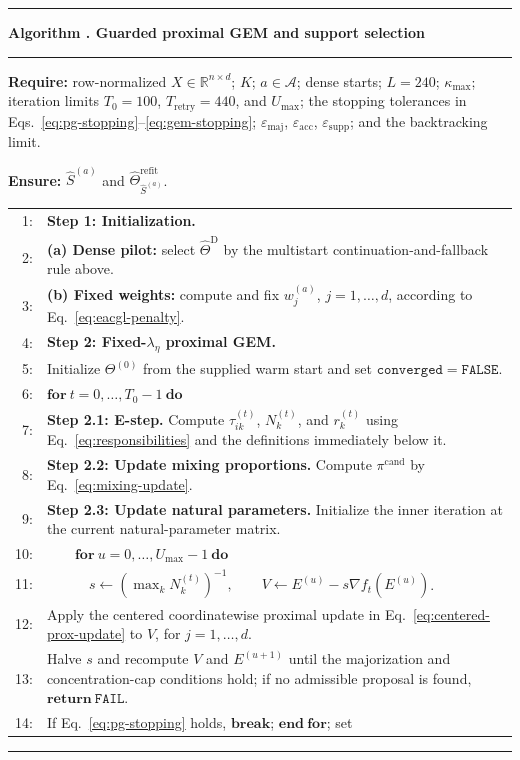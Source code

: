 \documentclass[preprint,12pt,authoryear]{elsarticle}
\newcounter{algorithm}
\newenvironment{boxedalgorithm}[1]{%
  \refstepcounter{algorithm}%
  \par\medskip
  \noindent
  \begin{minipage}{\textwidth}
  \hrule\vspace{1pt}
  \textbf{Algorithm \thealgorithm. #1}\par\vspace{1pt}
  \hrule\vspace{2pt}\fontsize{9.0}{9.6}\selectfont
}{%
  \hrule
  \end{minipage}
  \par\medskip
}
\begin{document}
\begin{boxedalgorithm}{Guarded proximal GEM and support selection}
\label{alg:ecgl-path}
\textbf{Require:} row-normalized $X\in\mathbb R^{n\times d}$; $K$;
$a\in\mathcal A$; dense starts; $L=240$; $\kappa_{\max}$; iteration limits
$T_0=100$, $T_{\mathrm{retry}}=440$, and $U_{\max}$; the stopping tolerances in
Eqs.~\eqref{eq:pg-stopping}--\eqref{eq:gem-stopping};
$\varepsilon_{\mathrm{maj}}$, $\varepsilon_{\mathrm{acc}}$,
$\varepsilon_{\mathrm{supp}}$; and the backtracking limit.\par
\textbf{Ensure:} $\widehat S^{(a)}$ and
$\widehat\Theta_{\widehat S^{(a)}}^{\mathrm{refit}}$.
\par\smallskip
{\renewcommand{\arraystretch}{0.96}
\begin{tabularx}{\textwidth}{@{}r@{\hspace{0.60em}}X@{}}
1: & \textbf{Step 1: Initialization.}
\tabularnewline
2: & \textbf{(a) Dense pilot:} select $\widehat\Theta^{\mathrm D}$ by the
multistart continuation-and-fallback rule above.
\tabularnewline
3: & \textbf{(b) Fixed weights:} compute and fix
$w_j^{(a)}$, $j=1,\ldots,d$, according to
Eq.~\eqref{eq:eacgl-penalty}.
\tabularnewline
4: & \textbf{Step 2: Fixed-$\lambda_\eta$ proximal GEM.}
\tabularnewline
5: & Initialize $\Theta^{(0)}$ from the supplied warm start and set
$\mathtt{converged}=\mathtt{FALSE}$.
\tabularnewline
6: & $\mathbf{for}\ t=0,\ldots,T_0-1\ \mathbf{do}$
\tabularnewline
7: & \quad\textbf{Step 2.1: E-step.} Compute $\tau_{ik}^{(t)}$,
$N_k^{(t)}$, and $r_k^{(t)}$ using Eq.~\eqref{eq:responsibilities} and the
definitions immediately below it.
\tabularnewline
8: & \quad\textbf{Step 2.2: Update mixing proportions.}
Compute $\pi^{\mathrm{cand}}$ by Eq.~\eqref{eq:mixing-update}.
\tabularnewline
9: & \quad\textbf{Step 2.3: Update natural parameters.}
Initialize the inner iteration at the current natural-parameter matrix.
\tabularnewline
10: & $\displaystyle
\qquad\mathbf{for}\ u=0,\ldots,U_{\max}-1\ \mathbf{do}$
\tabularnewline
11: & $\displaystyle
\qquad\quad s\leftarrow(\max_kN_k^{(t)})^{-1},\qquad
V\leftarrow E^{(u)}-s\nabla f_t(E^{(u)})$.
\tabularnewline
12: & \qquad Apply the centered coordinatewise proximal update in
Eq.~\eqref{eq:centered-prox-update} to $V$, for $j=1,\ldots,d$.
\tabularnewline
13: & Halve $s$ and recompute $V$ and $E^{(u+1)}$ until the majorization and
concentration-cap conditions hold; if no admissible proposal is found,
$\mathbf{return}\ \mathtt{FAIL}$.
\tabularnewline
14: & If Eq.~\eqref{eq:pg-stopping} holds, $\mathbf{break}$;
$\mathbf{end\ for}$; set

\end{tabularx}}
\end{boxedalgorithm}
\end{document}
